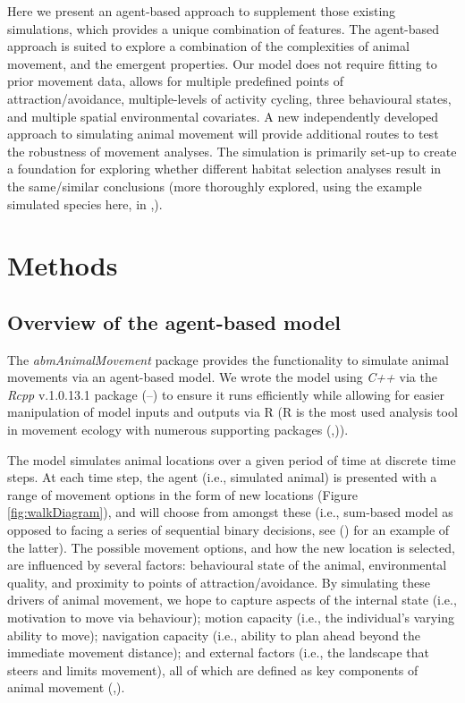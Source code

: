 \documentclass[10pt,a4paper]{article}
\begin{document}
Here we present an agent-based approach to supplement those existing simulations, which provides a unique combination of features.
The agent-based approach is suited to explore a combination of the complexities of animal movement, and the emergent properties.
Our model does not require fitting to prior movement data, allows for multiple predefined points of attraction/avoidance, multiple-levels of activity cycling, three behavioural states, and multiple spatial environmental covariates.
A new independently developed approach to simulating animal movement will provide additional routes to test the robustness of movement analyses.
The simulation is primarily set-up to create a foundation for exploring whether different habitat selection analyses result in the same/similar conclusions (more thoroughly explored, using the example simulated species here, in ,).

\section{Methods}\label{methods}

\subsection{Overview of the agent-based model}\label{overview-of-the-agent-based-model}

The \emph{abmAnimalMovement} package provides the functionality to simulate animal movements via an agent-based model.
We wrote the model using \emph{C++} via the \emph{Rcpp} v.1.0.13.1 package (--) to ensure it runs efficiently while allowing for easier manipulation of model inputs and outputs via R (R is the most used analysis tool in movement ecology with numerous supporting packages (,)).

The model simulates animal locations over a given period of time at discrete time steps.
At each time step, the agent (i.e., simulated animal) is presented with a range of movement options in the form of new locations (Figure \ref{fig:walkDiagram}), and will choose from amongst these (i.e., sum-based model as opposed to facing a series of sequential binary decisions, see () for an example of the latter).
The possible movement options, and how the new location is selected, are influenced by several factors: behavioural state of the animal, environmental quality, and proximity to points of attraction/avoidance.
By simulating these drivers of animal movement, we hope to capture aspects of the internal state (i.e., motivation to move via behaviour); motion capacity (i.e., the individual's varying ability to move); navigation capacity (i.e., ability to plan ahead beyond the immediate movement distance); and external factors (i.e., the landscape that steers and limits movement), all of which are defined as key components of animal movement (,).
\end{document}
